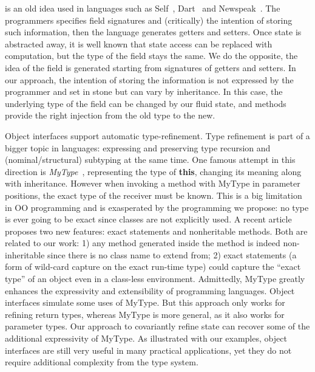 % 

\savespace
{}
is an old idea used in languages such as
Self~\cite{Ungar1987self}, Dart~\cite{Dart} and Newspeak~\cite{Bracha_thenewspeak}.
The programmers specifies field signatures and (critically) the intention of storing such information,
then the language generates getters and setters.
Once state is abstracted away, it is well known that state
access can be replaced with computation, but the type of the field stays the same.
We do the opposite, the idea of the field is generated starting from signatures of
getters and setters. %
In our approach, the intention of storing the information is not expressed by the programmer and set in stone
but can vary by inheritance.
In this case, the underlying type of the field can be changed by our fluid state,
 and \Q@with@ methods provide the right injection from the old type to the new.

\savespace
{}
Object interfaces support automatic type-refinement.
Type refinement is part of a bigger topic in \classbased languages: expressing and
preserving type recursion and (nominal/structural) subtyping at the same time.
One famous attempt in this direction is
\emph{MyType}~\cite{bruce1994paradigmatic}, representing the type of
\textbf{this}, changing its meaning along with inheritance. However when
invoking a method with MyType in parameter positions, the exact type of the
receiver must be known. This is a big limitation in \classbased OO
programming and is exasperated by the \interfacebased programming we propose: no
type is ever going to be exact since classes are not explicitly used. A recent
article~\cite{Saito2013933} proposes two
new features: exact statements and nonheritable methods. Both are
related to our work: 1) any method generated inside the \Q@of@ method is indeed
non-inheritable since there is no class name to extend from; 2) exact
statements (a form of wild-card capture on the exact run-time type) could
capture the ``exact type'' of an object even in a class-less
environment.
Admittedly, MyType greatly enhances the expressivity and extensibility of
\objectoriented programming languages. Object interfaces %
simulate some uses of MyType. But this approach only works for refining
return types, whereas MyType is more general, as it also works for
parameter types. Our approach to covariantly refine state can recover
some of the additional expressivity of MyType. As illustrated with our examples, object interfaces are still very useful in many
practical applications, yet they do not require additional
complexity from the type system.

